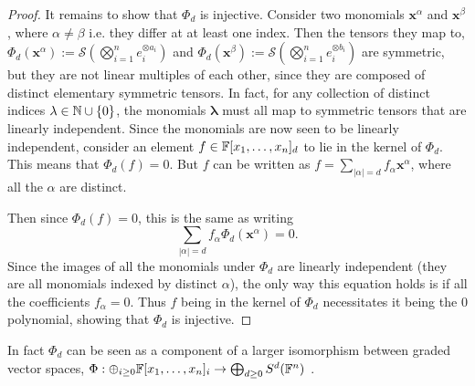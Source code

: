 \documentclass[../Lael_John_MasterThesis_Draft.tex]{subfiles}
\begin{document}
\begin{proof}
    It remains to show that $\Phi_d$ is injective. Consider two monomials $\mathbf{x}^{\alpha}$ and $\mathbf{x}^{\beta}$, where $\alpha \neq \beta$ i.e. they differ at at least one index. Then the tensors they map to, $\Phi_d(\mathbf{x}^{\alpha}) := \mathcal{S}\left(\bigotimes_{i=1}^n e_i^{\otimes a_i}\right)$ and $\Phi_d(\mathbf{x}^{\beta}) := \mathcal{S}\left(\bigotimes_{i=1}^n e_i^{\otimes b_i}\right)$ are symmetric, but they are not linear multiples of each other, since they are composed of distinct elementary symmetric tensors. In fact, for any collection of distinct indices $\lambda \in \mathbb{N} \cup \{0\}$, the monomials $\mathbf{\lambda}$ must all map to symmetric tensors that are linearly independent. Since the monomials are now seen to be linearly independent, consider an element $f \in \mathbb{F}[x_1, \ldots, x_n]_d$ to lie in the kernel of $\Phi_d$. This means that $\Phi_d(f) = 0$. But $f$ can be written as $f = \sum_{|\alpha| = d} f_{\alpha}\mathbf{x}^{\alpha}$, where all the ${\alpha}$ are distinct. 

    Then since $\Phi_d(f) = 0$, this is the same as writing $$\sum_{|\alpha| = d} f_{\alpha}\Phi_d(\mathbf{x}^{\alpha}) = 0.$$
    Since the images of all the monomials under $\Phi_d$ are linearly independent (they are all monomials indexed by distinct $\alpha$), the only way this equation holds is if all the coefficients $f_{\alpha} = 0$. Thus $f$ being in the kernel of $\Phi_d$ necessitates it being the $0$ polynomial, showing that $\Phi_d$ is injective. 
\end{proof}
In fact $\Phi_d$ can be seen as a component of a larger isomorphism between graded vector spaces, $\Phi: \oplus_{i \geq 0}\mathbb{F}[x_1, \ldots, x_n]_i \to \bigoplus_{d \geq 0} S^d(\mathbb{F}^n)$ \cite{comon_symmetric_2008}. 

\end{document}
